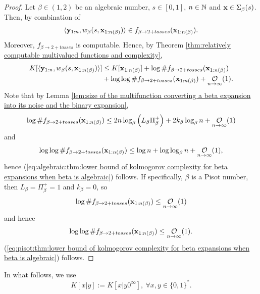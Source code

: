 \begin{proof}
    Let $\beta \in (1,2)$ be an algebraic number, $s \in [0,1]$, $n \in \mathbb{N}$ and ${\bf x} \in \Sigma_\beta(s)$. Then, by combination of 
    \begin{equation}
        \langle {\bf y}_{1:n}, w_\beta(s,{\bf x}_{1:n(\beta)})\rangle \in f_{\beta \to 2+tosses}({\bf x}_{1:n(\beta)}).
    \end{equation}
    Moreover, $f_{\beta \to 2+tosses}$ is computable. Hence, by Theorem \ref{thm:relatively computable multivalued functions and complexity},
    \begin{align}
        K[\langle \yf_{1:n}, w_\beta(s,\xf_{1:\nlogbeta})\rangle] &\leq K[\xf_{1:\nlogbeta}] + \log \#f_{\beta \to 2+tosses}(\xf_{1:\nlogbeta})\\
        & + \log \log \#f_{\beta \to 2+tosses}(\xf_{1:\nlogbeta}) + \bigOx[1]{n}.
    \end{align}
    Note that by Lemma \ref{lem:size of the multifunction converting a beta expansion into its noise and the binary expansion}, 
    \begin{equation}
        \log \#f_{\beta \to 2+tosses}(\xf_{1:\nlogbeta}) \leq 2n \log_\beta \left(L_\beta \Pi^+_\beta \right) + 2k_\beta \log_\beta n + \bigOx[1]{n}
    \end{equation}
    and 
    \begin{equation}
        \log \log \#f_{\beta \to 2+tosses}(\xf_{1:\nlogbeta}) \leq \log n + \log \log_\beta n + \bigOx[1]{n},
    \end{equation}
    hence (\ref{eq:algebraic:thm:lower bound of kolmogorov complexity for beta expansions when beta is algebraic}) follows. If specifically, $\beta$ is a Pisot number, then $L_\beta = \Pi^+_\beta = 1$ and $k_\beta = 0$, so 
    \begin{equation}
        \log \#f_{\beta \to 2+tosses}(\xf_{1:\nlogbeta}) \leq \bigOx[1]{n}
    \end{equation}
    and hence
    \begin{equation}
        \log \log \#f_{\beta \to 2+tosses}(\xf_{1:\nlogbeta})\leq \bigOx[1]{n}.
    \end{equation}
    (\ref{eq:pisot:thm:lower bound of kolmogorov complexity for beta expansions when beta is algebraic}) follows.
\end{proof}
\noindent In what follows, we use  
\begin{equation}
    K[x|y] := K[x|y0^\infty], \ \forall x,y \in \{0,1\}^\ast.
\end{equation}
